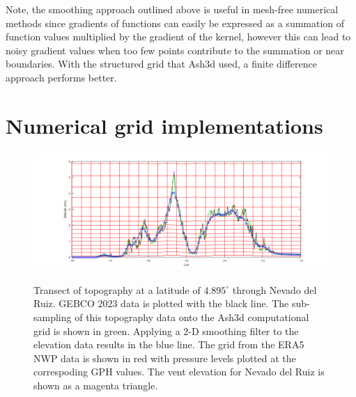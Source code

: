 Note, the smoothing approach outlined above is useful in mesh-free numerical
methods since gradients of functions can easily be expressed as a summation
of function values multiplied by the gradient of the kernel, however this can
lead to noisy gradient values when too few points contribute to the summation
or near boundaries. With the structured grid that Ash3d used, a finite difference
approach performs better.

\section{Numerical grid implementations}\label{ChapAppendTopo_Sec_GridImp}

\begin{figure}[htbp]\vspace*{0cm}\hspace*{0cm}
\includegraphics[angle=0,scale=0.4]{Figures/Apx_Topo/TopoRaw_Met.png}\\
\parbox{15cm}{\caption{\label{FigTopo_profile}
Transect of topography at a latitude of $4.895^{\circ}$ through Nevado del Ruiz.
GEBCO 2023 data is plotted with the black line. The sub-sampling of this topography
data onto the Ash3d computational grid is shown in green. Applying a 2-D smoothing filter
to the elevation data results in the blue line. The grid from the ERA5 NWP data is shown
in red with pressure levels plotted at the correspoding GPH values. The vent elevation
for Nevado del Ruiz is shown as a magenta triangle.
}}
\end{figure}



